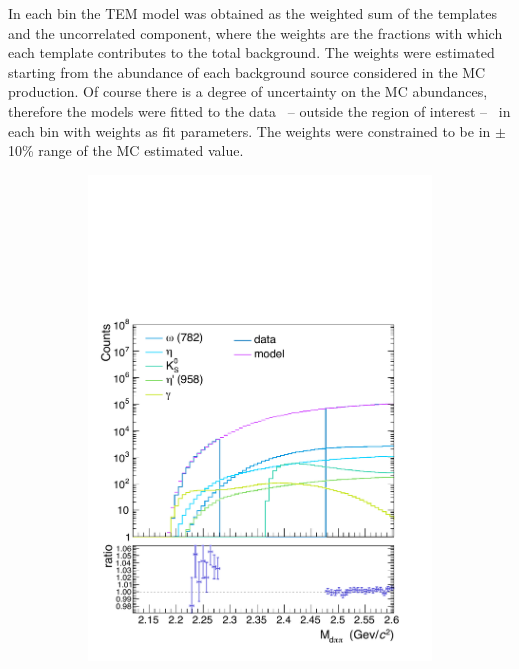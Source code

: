 In each \pt bin the TEM model was obtained as the weighted sum of the templates and the
uncorrelated component, where the weights are the fractions with which each template contributes to
the total background.
The weights were estimated starting from the abundance of each background source considered in the MC
production.
Of course there is a degree of uncertainty on the MC abundances, therefore the models were fitted
to the data \ -- outside the region of interest -- \ in each \pt bin with weights as fit parameters. 
The weights were constrained to be in $\pm$10\% range of the MC estimated value.

\begin{figure} [htb]
\begin{subfigure}{.33\textwidth}
  \centering
  \captionsetup{justification=centering}
  \includegraphics[width=\linewidth]{gfx/can0}
  \caption{}
  \label{fig:tem01}

\end{subfigure}
\end{figure}
